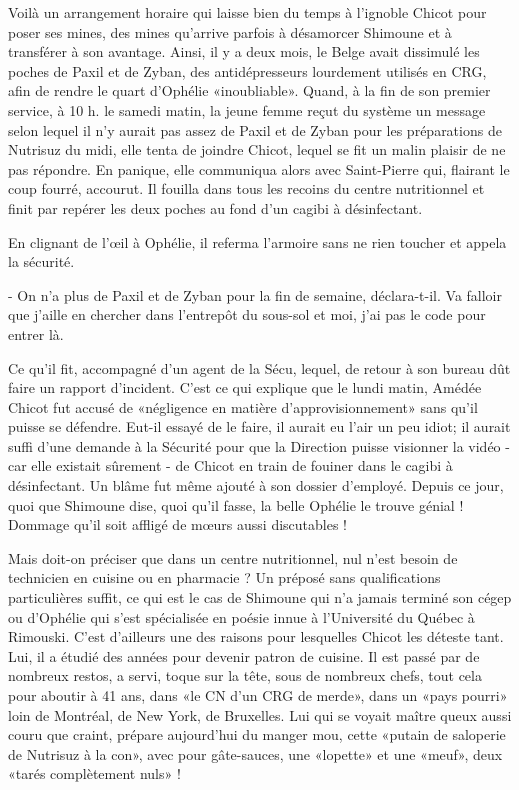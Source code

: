 Voilà un arrangement horaire qui laisse bien du temps à l’ignoble Chicot pour poser ses mines, des mines qu’arrive parfois à désamorcer Shimoune et à transférer à son avantage. Ainsi, il y a deux mois, le Belge avait dissimulé les poches de Paxil et de Zyban, des antidépresseurs lourdement utilisés en CRG, afin de rendre le quart d’Ophélie «inoubliable». Quand, à la fin de son premier service, à 10 h. le samedi matin, la jeune femme reçut du système un message selon lequel il n’y aurait pas assez de Paxil et de Zyban pour les préparations de Nutrisuz du midi, elle tenta de joindre Chicot, lequel se fit un malin plaisir de ne pas répondre. En panique, elle communiqua alors avec Saint-Pierre qui, flairant le coup fourré, accourut. Il fouilla dans tous les recoins du centre nutritionnel et finit par repérer les deux poches au fond d’un cagibi à désinfectant.

En clignant de l’œil à Ophélie, il referma l’armoire sans ne rien toucher et appela la sécurité.

- On n’a plus de Paxil et de Zyban pour la fin de semaine, déclara-t-il. Va falloir que j’aille en chercher dans l’entrepôt du sous-sol et moi, j’ai pas le code pour entrer là.

Ce qu’il fit, accompagné d’un agent de la Sécu, lequel, de retour à son bureau dût faire un rapport d’incident. C’est ce qui explique que le lundi matin, Amédée Chicot fut accusé de «négligence en matière d’approvisionnement» sans qu’il puisse se défendre. Eut-il essayé de le faire, il aurait eu l’air un peu idiot; il aurait suffi d’une demande à la Sécurité pour que la Direction puisse visionner la vidéo - car elle existait sûrement - de Chicot en train de fouiner dans le cagibi à désinfectant. Un blâme fut même ajouté à son dossier d’employé. Depuis ce jour, quoi que Shimoune dise, quoi qu’il fasse, la belle Ophélie le trouve génial ! Dommage qu’il soit affligé de mœurs aussi discutables !

Mais doit-on préciser que dans un centre nutritionnel, nul n’est besoin de technicien en cuisine ou en pharmacie ? Un préposé sans qualifications particulières suffit, ce qui est le cas de Shimoune qui n’a jamais terminé son cégep ou d’Ophélie qui s’est spécialisée en poésie innue à l’Université du Québec à Rimouski. C’est d’ailleurs une des raisons pour lesquelles Chicot les déteste tant. Lui, il a étudié des années pour devenir patron de cuisine. Il est passé par de nombreux restos, a servi, toque sur la tête, sous de nombreux chefs, tout cela pour aboutir à 41 ans, dans «le CN d’un CRG de merde», dans un «pays pourri» loin de Montréal, de New York, de Bruxelles. Lui qui se voyait maître queux aussi couru que craint, prépare aujourd’hui du manger mou, cette «putain de saloperie de Nutrisuz à la con», avec pour gâte-sauces, une «lopette» et une «meuf», deux «tarés complètement nuls» !

